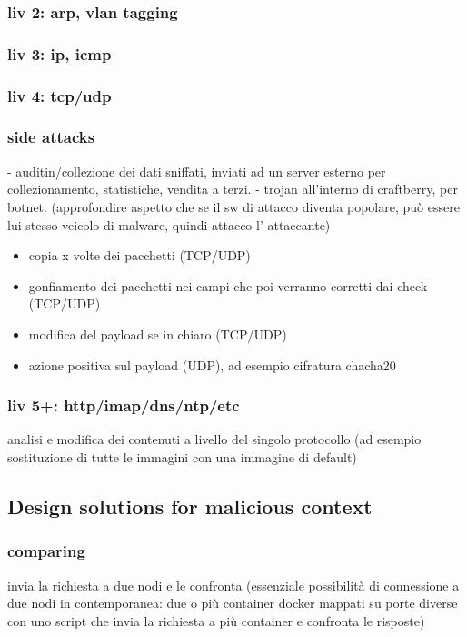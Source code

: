 \documentclass[]{article}
\begin{document}
			\subsubsection{liv 2: arp, vlan tagging}
			\subsubsection{liv 3: ip, icmp}
			\subsubsection{liv 4: tcp/udp}
			\subsubsection{side attacks}
				- auditin/collezione dei dati sniffati, inviati ad un server esterno per collezionamento, statistiche, vendita a terzi.
				- trojan all'interno di craftberry, per botnet. (approfondire aspetto che se il sw di attacco diventa popolare, può essere lui stesso veicolo di malware, quindi attacco l' attaccante)
			
			\begin{itemize}
				\item copia x volte dei pacchetti (TCP/UDP)
				\item gonfiamento dei pacchetti nei campi che poi verranno corretti dai check (TCP/UDP)
				\item modifica del payload se in chiaro (TCP/UDP)
				\item azione positiva sul payload (UDP), ad esempio cifratura chacha20
			\end{itemize}
		 	\subsubsection{liv 5+: http/imap/dns/ntp/etc}
				analisi e modifica dei contenuti a livello del singolo protocollo (ad esempio sostituzione di tutte le immagini con una immagine di default)
			
	\subsection{Design solutions for malicious context}
		\subsubsection{comparing}
		invia la richiesta a due nodi e le confronta (essenziale possibilità di connessione a due nodi in contemporanea: due o più container docker mappati su porte diverse con uno script che invia la richiesta a più container e confronta le risposte)
\end{document}
